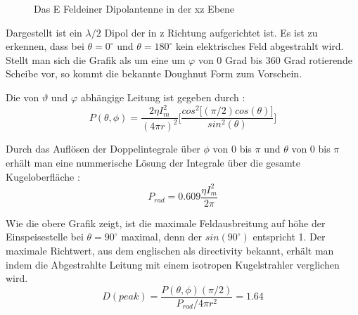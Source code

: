 \begin{figure}
\begin{center}
\end{center}
	\caption{Das E Feldeiner Dipolantenne in der xz Ebene}
	\label{DipolEFerd}
\end{figure}



Dargestellt ist ein $\lambda/2$ Dipol der in z Richtung aufgerichtet ist. Es ist zu erkennen, dass bei $\theta = 0 ^\circ $  und $\theta = 180 ^\circ $ kein elektrisches Feld abgestrahlt wird. Stellt man sich die Grafik als um eine um $\varphi$ von 0 Grad bis 360 Grad rotierende Scheibe vor, so kommt die bekannte Doughnut Form zum Vorschein.

Die von $\vartheta$ und $\varphi$ abhängige Leitung ist gegeben durch \cite{elliott1981antenna}:
\begin{equation}
P(\theta,\phi)=\frac{2\eta I_{m}^{2}}{(4\pi r)^{2}}\lbrack \frac{cos^{2}\lbrack (\pi/2) cos(\theta)\rbrack}{sin^{2}(\theta)}\rbrack
\end{equation}

Durch das Auflösen der Doppelintegrale über $\phi$ von 0 bis $\pi$  und $\theta$ von 0 bis $\pi$ erhält man eine nummerische Lösung der Integrale über die gesamte Kugeloberfläche \cite{elliott1981antenna}:
\begin{equation}
P_{rad}=0.609 \frac{\eta I_{m}^{2}}{2\pi}
\end{equation}

Wie die obere Grafik  zeigt, ist die maximale Feldausbreitung auf höhe der Einspeisestelle bei $\theta = 90 ^\circ $ maximal,  denn der  $sin(90 ^\circ ) $ entspricht 1.
Der maximale Richtwert,  aus dem englischen als directivity bekannt, erhält man indem die Abgestrahlte Leitung mit einem isotropen Kugelstrahler verglichen wird\cite{elliott1981antenna}.
\begin{equation}
D(peak)=\frac{P(\theta,\phi)(\pi/2)}{P_{rad}/ 4 \pi r^{2}} =1.64
\label{eq:Directivity}
\end{equation}

